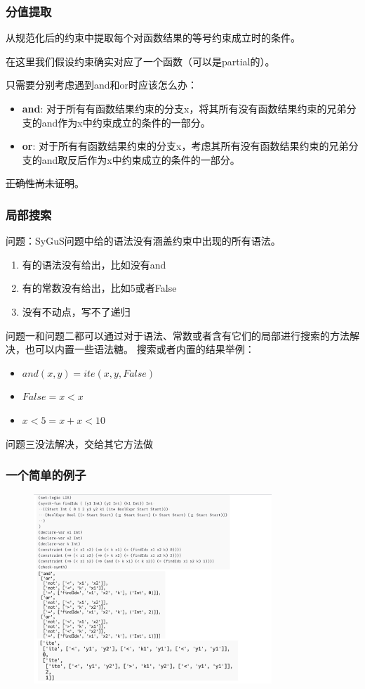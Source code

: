 \documentclass[notheorems]{beamer} %
\begin{document}
  \begin{frame}
    \frametitle{分值提取}
    从规范化后的约束中提取每个对函数结果的等号约束成立时的条件。

    在这里我们假设约束确实对应了一个函数（可以是partial的）。

    只需要分别考虑遇到and和or时应该怎么办：
    \begin{itemize}
      \item \textbf{and}: 对于所有有函数结果约束的分支x，将其所有没有函数结果约束的兄弟分支的and作为x中约束成立的条件的一部分。
      \item \textbf{or}: 对于所有有函数结果约束的分支x，考虑其所有没有函数结果约束的兄弟分支的and取反后作为x中约束成立的条件的一部分。
    \end{itemize}

    \sout{正确性尚未证明}。
  \end{frame}

  \begin{frame}
    \frametitle{局部搜索}
    问题：SyGuS问题中给的语法没有涵盖约束中出现的所有语法。
    \begin{enumerate}
      \item 有的语法没有给出，比如没有and
      \item 有的常数没有给出，比如5或者False
      \item 没有不动点，写不了递归
    \end{enumerate}
    问题一和问题二都可以通过对于语法、常数或者含有它们的局部进行搜索的方法解决，也可以内置一些语法糖。
    搜索或者内置的结果举例：
    \begin{itemize}
      \item $and(x,y)=ite(x,y,False)$
      \item $False = x < x$
      \item $x<5 = x+x < 10$
    \end{itemize}
    问题三没法解决，交给其它方法做
  \end{frame}

  \begin{frame}
    \frametitle{一个简单的例子}
    \begin{figure}
      \centering
      \includegraphics[width=0.8\textwidth]{example.png}
    \end{figure}
  \end{frame}
\end{document}
